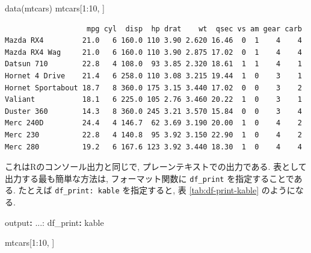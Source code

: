 \documentclass[
  xelatex,ja=standard,jafont=noto]{bxjsbook}
\newenvironment{Shaded}{\begin{snugshade}}{\end{snugshade}}
\newcommand{\AttributeTok}[1]{\textcolor[rgb]{0.77,0.63,0.00}{#1}}
\newcommand{\DecValTok}[1]{\textcolor[rgb]{0.00,0.00,0.81}{#1}}
\newcommand{\FunctionTok}[1]{\textcolor[rgb]{0.00,0.00,0.00}{#1}}
\newcommand{\KeywordTok}[1]{\textcolor[rgb]{0.13,0.29,0.53}{\textbf{#1}}}
\newcommand{\NormalTok}[1]{#1}
\newcommand{\SpecialCharTok}[1]{\textcolor[rgb]{0.00,0.00,0.00}{#1}}
\theoremstyle{definition}
\theoremstyle{definition}
\theoremstyle{definition}
\theoremstyle{definition}
\theoremstyle{remark}
\begin{document}
\begin{Shaded}
\begin{Highlighting}[numbers=left,,]
\FunctionTok{data}\NormalTok{(mtcars)}
\NormalTok{mtcars[}\DecValTok{1}\SpecialCharTok{:}\DecValTok{10}\NormalTok{, ]}
\end{Highlighting}
\end{Shaded}

\begin{verbatim}
                   mpg cyl  disp  hp drat    wt  qsec vs am gear carb
Mazda RX4         21.0   6 160.0 110 3.90 2.620 16.46  0  1    4    4
Mazda RX4 Wag     21.0   6 160.0 110 3.90 2.875 17.02  0  1    4    4
Datsun 710        22.8   4 108.0  93 3.85 2.320 18.61  1  1    4    1
Hornet 4 Drive    21.4   6 258.0 110 3.08 3.215 19.44  1  0    3    1
Hornet Sportabout 18.7   8 360.0 175 3.15 3.440 17.02  0  0    3    2
Valiant           18.1   6 225.0 105 2.76 3.460 20.22  1  0    3    1
Duster 360        14.3   8 360.0 245 3.21 3.570 15.84  0  0    3    4
Merc 240D         24.4   4 146.7  62 3.69 3.190 20.00  1  0    4    2
Merc 230          22.8   4 140.8  95 3.92 3.150 22.90  1  0    4    2
Merc 280          19.2   6 167.6 123 3.92 3.440 18.30  1  0    4    4
\end{verbatim}

これはRのコンソール出力と同じで, プレーンテキストでの出力である.
表として出力する最も簡単な方法は, フォーマット関数に \texttt{df\_print}
を指定することである. たとえば \texttt{df\_print:\ kable} を指定すると,
表 \ref{tab:df-print-kable} のようになる.

\begin{Shaded}
\begin{Highlighting}[]
\FunctionTok{output}\KeywordTok{:}\AttributeTok{ ...:}
\AttributeTok{  }\FunctionTok{df\_print}\KeywordTok{:}\AttributeTok{ kable}
\end{Highlighting}
\end{Shaded}

\begin{Shaded}
\begin{Highlighting}[numbers=left,,]
\NormalTok{mtcars[}\DecValTok{1}\SpecialCharTok{:}\DecValTok{10}\NormalTok{, ]}
\end{Highlighting}
\end{Shaded}
\end{document}
